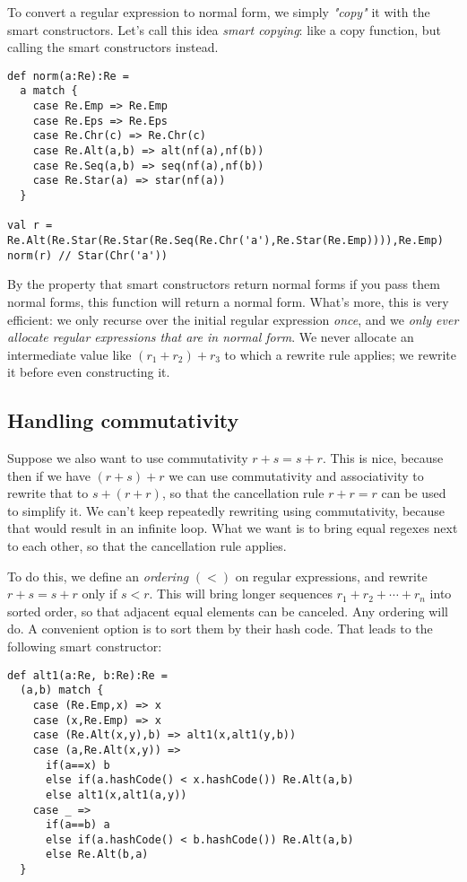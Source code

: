 To convert a regular expression to normal form, we simply \emph{"copy"} it with the smart constructors.
Let's call this idea \emph{smart copying}: like a copy function, but calling the smart constructors instead.

\begin{lstlisting}
def norm(a:Re):Re =
  a match {
    case Re.Emp => Re.Emp
    case Re.Eps => Re.Eps
    case Re.Chr(c) => Re.Chr(c)
    case Re.Alt(a,b) => alt(nf(a),nf(b))
    case Re.Seq(a,b) => seq(nf(a),nf(b))
    case Re.Star(a) => star(nf(a))
  }

val r = Re.Alt(Re.Star(Re.Star(Re.Seq(Re.Chr('a'),Re.Star(Re.Emp)))),Re.Emp)
norm(r) // Star(Chr('a'))
\end{lstlisting}

By the property that smart constructors return normal forms if you pass them normal forms, this function will return a normal form. What's more, this is very efficient: we only recurse over the initial regular expression \emph{once}, and we \emph{only ever allocate regular expressions that are in normal form}. We never allocate an intermediate value like $(r_1 + r_2) + r_3$ to which a rewrite rule applies; we rewrite it before even constructing it.

\subsection{Handling commutativity}

Suppose we also want to use commutativity $r + s = s + r$. This is nice, because then if we have $(r + s) + r$ we can use commutativity and associativity to rewrite that to $s + (r + r)$, so that the cancellation rule $r + r = r$ can be used to simplify it. We can't keep repeatedly rewriting using commutativity, because that would result in an infinite loop. What we want is to bring equal regexes next to each other, so that the cancellation rule applies.

To do this, we define an \emph{ordering} $(<)$ on regular expressions, and rewrite $r + s = s + r$ only if $s < r$. This will bring longer sequences $r_1 + r_2 + \cdots + r_n$ into sorted order, so that adjacent equal elements can be canceled. Any ordering will do. A convenient option is to sort them by their hash code. That leads to the following smart constructor:

\begin{lstlisting}
def alt1(a:Re, b:Re):Re =
  (a,b) match {
    case (Re.Emp,x) => x
    case (x,Re.Emp) => x
    case (Re.Alt(x,y),b) => alt1(x,alt1(y,b))
    case (a,Re.Alt(x,y)) =>
      if(a==x) b
      else if(a.hashCode() < x.hashCode()) Re.Alt(a,b)
      else alt1(x,alt1(a,y))
    case _ =>
      if(a==b) a
      else if(a.hashCode() < b.hashCode()) Re.Alt(a,b)
      else Re.Alt(b,a)
  }
\end{lstlisting}

